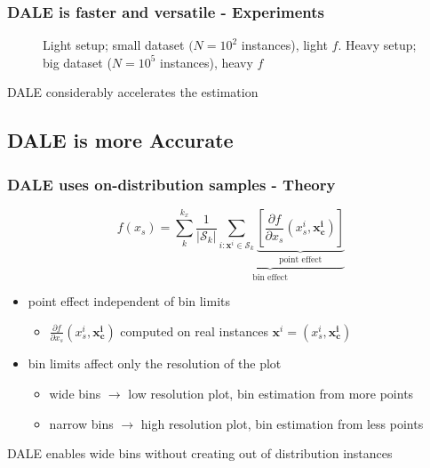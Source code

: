 \documentclass{beamer}
\newcommand{\xb}{\boldsymbol{x}}
\begin{document}
\begin{frame}
  \frametitle{DALE is faster and versatile - Experiments}
  \begin{figure}[h]
  \centering
  \resizebox{.4\columnwidth}{!}{}
  \resizebox{.43\columnwidth}{!}{}
  \caption[Case-1-fig-1]{Light setup; small dataset \((N=10^2\) instances), light \(f\). Heavy setup; big dataset (\(N=10^5\) instances), heavy \(f\)}
  \label{fig:case-1-plots-1}
\end{figure}

  \noindent\makebox[\linewidth]{\rule{\paperwidth}{0.4pt}}
  DALE considerably accelerates the estimation
\end{frame}


\subsection{DALE is more Accurate}

\begin{frame}
  \frametitle{DALE uses on-distribution samples - Theory}
  \[f(x_s) = \sum_k^{k_x} \underbrace{\frac{1}{|\mathcal{S}_k|}
      \sum_{i:\xb^i \in \mathcal{S}_k} \underbrace{[\frac{\partial
          f}{\partial x_s}(x_s^i, \bm{x^i_c})]}_{\text{point
          effect}}}_{\text{bin effect}} \]

  \begin{itemize}
  \item point effect \alert{independent} of bin limits
    \begin{itemize}
    \item \(\frac{\partial f}{\partial x_s}(x_s^i, \bm{x^i_c})\)
      computed on real instances \(\bm{x}^i = (x_s^i, \bm{x_c^i})\)
    \end{itemize}
  \item bin limits affect only the \alert{resolution} of the plot
    \begin{itemize}
    \item wide bins \(\rightarrow\) low resolution plot, bin
      estimation from more points
    \item narrow bins \(\rightarrow\) high resolution plot, bin
      estimation from less points
    \end{itemize}
  \end{itemize}
  \noindent\makebox[\linewidth]{\rule{\paperwidth}{0.4pt}}
  DALE enables wide bins without creating out of distribution instances
\end{frame}
\end{document}
